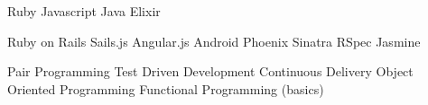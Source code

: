\begin{cvhonors}
  \cvhonor
    {Ruby}
    {Javascript}
    {Java}
    {Elixir}
  \cvhonor
    {}
    {}
    {}
    {}
\end{cvhonors}

\begin{cvhonors}
  \cvhonor
    {Ruby on Rails}
    {Sails.js}
    {Angular.js}
    {Android}
  \cvhonor
    {Phoenix}
    {Sinatra}
    {RSpec}
    {Jasmine}
  \cvhonor
    {}
    {}
    {}
    {}
\end{cvhonors}

\begin{cvhonors}
  \cvhonor
    {Pair Programming}
    {Test Driven Development}
    {Continuous Delivery}
    {Object Oriented Programming}
  \cvhonor
    {Functional Programming (basics)}
    {}
    {}
    {}
\end{cvhonors}